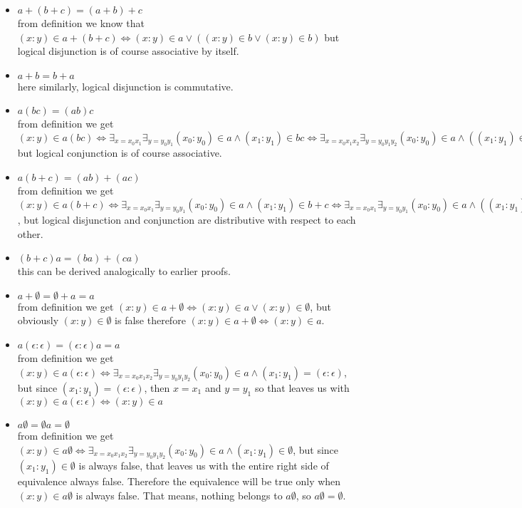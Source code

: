 \documentclass[12pt]{article}
\begin{document}
\begin{itemize}
	\item $a + (b + c) = (a + b) + c$ \\
	from definition we know that $(x:y) \in a + (b + c) \iff (x:y) \in a \vee ((x:y) \in b \vee (x:y) \in b) $ but logical disjunction is of course associative by itself.
	\item $ a + b = b + a $ \\
	here similarly, logical disjunction is commutative.
	\item $a(bc) = (ab)c$ \\
	from definition we get $(x:y) \in a(bc) \iff \exists_{x = x_0x_1} \exists_{y = y_0 y_1} (x_0:y_0) \in a \wedge (x_1:y_1) \in bc \iff \exists_{x = x_0x_1x_2} \exists_{y = y_0 y_1y_2} (x_0:y_0) \in a \wedge ((x_1:y_1) \in b \wedge (x_2:y_2) \in c)$ but logical conjunction is of course associative. 
	\item $a(b + c) = (ab) + (ac)$ \\
	from definition we get $(x:y) \in a(b+c) \iff \exists_{x = x_0x_1} \exists_{y = y_0 y_1} (x_0:y_0) \in a \wedge (x_1:y_1) \in b+c \iff \exists_{x = x_0x_1} \exists_{y = y_0 y_1} (x_0:y_0) \in a \wedge ((x_1:y_1) \in b \vee (x_1:y_1) \in c)$, but logical disjunction and conjunction are distributive with respect to each other. 
	\item $(b + c)a = (ba) + (ca)$ \\
	this can be derived analogically to earlier proofs.
	\item $a + \emptyset = \emptyset + a = a$ \\
	from definition we get $(x:y) \in a + \emptyset \iff (x:y) \in a \vee (x:y) \in \emptyset$, but obviously $(x:y) \in \emptyset$ is false therefore $(x:y) \in a + \emptyset \iff (x:y) \in a$. 
	\item $a (\epsilon:\epsilon) = (\epsilon:\epsilon) a = a$  \\
	from definition we get $(x:y) \in a (\epsilon:\epsilon) \iff  \exists_{x = x_0x_1x_2} \exists_{y = y_0 y_1y_2} (x_0:y_0) \in a \wedge (x_1:y_1) = (\epsilon:\epsilon)$, but since $(x_1:y_1) = (\epsilon:\epsilon)$, then $x=x_1$ and $y=y_1$ so that leaves us with  $(x:y) \in a (\epsilon:\epsilon) \iff   (x:y) \in a $
	\item $a\emptyset = \emptyset a = \emptyset$ \\
	from definition we get $(x:y) \in a \emptyset \iff  \exists_{x = x_0x_1x_2} \exists_{y = y_0 y_1y_2} (x_0:y_0) \in a \wedge (x_1:y_1) \in \emptyset$, but since $(x_1:y_1) \in \emptyset$ is always false, that leaves us with the entire right side of equivalence always false. Therefore the equivalence will be true only when $(x:y) \in a \emptyset$ is always false. That means, nothing belongs to $a \emptyset$, so $a \emptyset = \emptyset$.
\end{itemize}
\end{document}
